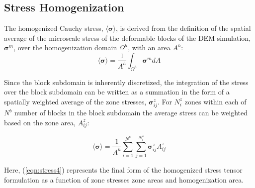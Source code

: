 \subsection{Stress Homogenization}

The homogenized Cauchy stress, $\langle\boldsymbol{\sigma}\rangle$, is derived from the definition of the spatial average of the microscale stress of the deformable blocks of the DEM simulation, $\boldsymbol{\sigma}^m$, over the homogenization domain $\Omega^{h}$, with an area $A^{h}$: 
\begin{equation}
\langle\boldsymbol{\sigma}\rangle=\frac{1}{A^{h}}\int_{\Omega^{h}}\boldsymbol{\sigma}^m dA\label{eqn:stress1}
\end{equation}






Since the block subdomain is inherently discretized, the integration of the stress over the block subdomain can be written as a summation in the form of a spatially weighted average of the zone stresses, $\boldsymbol{\sigma}_{ij}^{z}$. For $N_{i}^{z}$ zones within each of $N^{b}$ number of blocks in the block subdomain the average stress can be weighted based on the zone area, $A_{ij}^{z}$: 

\begin{equation}
\langle\boldsymbol{\sigma}\rangle=\frac{1}{A^{h}}\sum_{i=1}^{N^{b}}\sum_{j=1}^{N_{i}^{z}}\boldsymbol{\sigma}_{ij}^{z}A_{ij}^{z}\label{eqn:stress4}
\end{equation}

Here, (\ref{eqn:stress4}) represents the final form of the homogenized stress tensor formulation as a function of zone stresses zone areas and homogenization area.